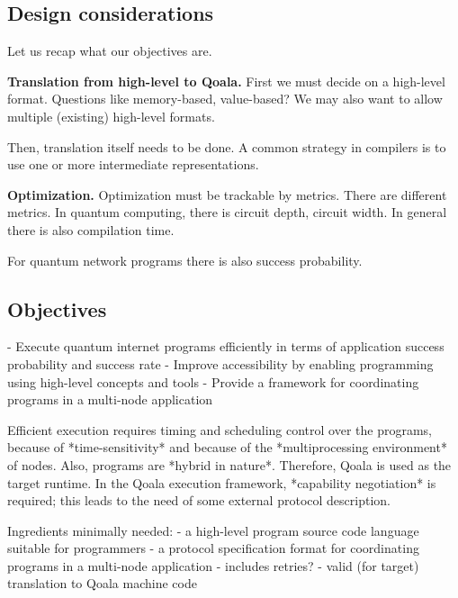 
\subsection{Design considerations}
Let us recap what our objectives are.

\textbf{Translation from high-level to Qoala.}
First we must decide on a high-level format.
Questions like memory-based, value-based?
We may also want to allow multiple (existing) high-level formats.

Then, translation itself needs to be done. 
A common strategy in compilers is to use one or more intermediate representations.

\textbf{Optimization.}
Optimization must be trackable  by metrics.
There are different metrics.
In quantum computing, there is circuit depth, circuit width.
In general there is also compilation time.

For quantum network programs there is also success probability.


\subsection{Objectives}
- Execute quantum internet programs efficiently in terms of application success probability and success rate
- Improve accessibility by enabling programming using high-level concepts and tools
- Provide a framework for coordinating programs in a multi-node application

Efficient execution requires timing and scheduling control over the programs, because of *time-sensitivity* and because of the *multiprocessing environment* of nodes.
Also, programs are *hybrid in nature*.
Therefore, Qoala is used as the target runtime.
In the Qoala execution framework, *capability negotiation* is required; this leads to the need of some external protocol description.


Ingredients minimally needed:
- a high-level program source code language suitable for programmers
- a protocol specification format for coordinating programs in a multi-node application
  - includes retries?
- valid (for target) translation to Qoala machine code

